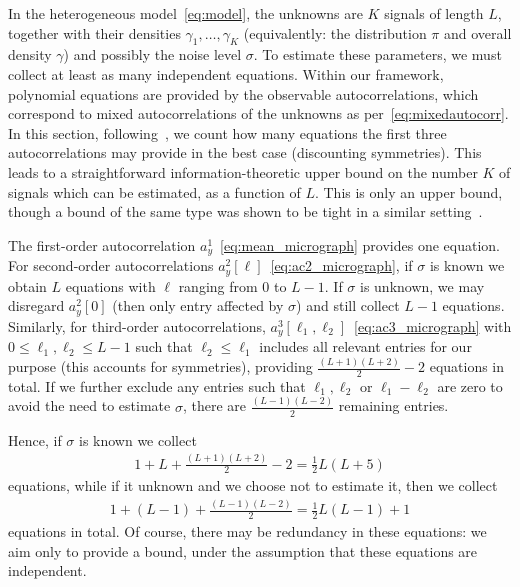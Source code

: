 \documentclass[12pt]{article}
\newcommand{\1}{\mathbf{1}}
\theoremstyle{plain}
\theoremstyle{definition}
\theoremstyle{remark}
\theoremstyle{plain}
\theoremstyle{remark}
\theoremstyle{plain}
\theoremstyle{plain}
\theoremstyle{plain}
\numberwithin{equation}{section}
\begin{document}
In the heterogeneous model~\eqref{eq:model}, the unknowns are $K$ signals of length $L$, together with their densities $\gamma_1, \ldots, \gamma_K$ (equivalently: the distribution $\pi$ and overall density $\gamma$) and possibly the noise level $\sigma$. To estimate these parameters, we must collect at least as many independent equations. Within our framework, polynomial equations are provided by the observable autocorrelations, which correspond to mixed autocorrelations of the unknowns as per~\eqref{eq:mixedautocorr}. In this section, following~\cite{boumal2017heterogeneous}, we count how many equations the first three autocorrelations may provide in the best case (discounting symmetries). This leads to a straightforward information-theoretic upper bound on the number $K$ of signals which can be estimated, as a function of $L$. This is only an upper bound, though a bound of the same type was shown to be tight in a similar setting~\cite{bandeira2017estimation}.

The first-order autocorrelation $a_y^1$~\eqref{eq:mean_micrograph} provides one equation. For second-order autocorrelations $a_y^2[\ell]$~\eqref{eq:ac2_micrograph}, if $\sigma$ is known we obtain $L$ equations with $\ell$ ranging from 0 to $L-1$. If $\sigma$ is unknown, we may disregard $a_y^2[0]$ (then only entry affected by $\sigma$) and still collect $L-1$ equations. Similarly, for third-order autocorrelations, $a_y^3[\ell_1, \ell_2]$~\eqref{eq:ac3_micrograph} with $0 \leq \ell_1, \ell_2 \leq L-1$ such that $\ell_2 \leq \ell_1$ includes all relevant entries for our purpose (this accounts for symmetries), providing $\frac{(L+1)(L+2)}{2}-2$ equations in total. 
If we further exclude any entries such that $\ell_1, \ell_2$ or $\ell_1 - \ell_2$ are zero to avoid the need to estimate $\sigma$, there are $\frac{(L-1)(L-2)}{2}$ remaining entries.

Hence, if $\sigma$ is known we collect
\begin{align*}
	1 + L + \frac{(L+1)(L+2)}{2}-2 = \frac{1}{2} L (L+5)
\end{align*}
equations, while if it unknown and we choose not to estimate it, then we collect
\begin{align*}
	1 + (L-1) + \frac{(L-1)(L-2)}{2} = \frac{1}{2} L (L-1) + 1
\end{align*}
equations in total. Of course, there may be redundancy in these equations: we aim only to provide a bound, under the assumption that these equations are independent.
\end{document}
